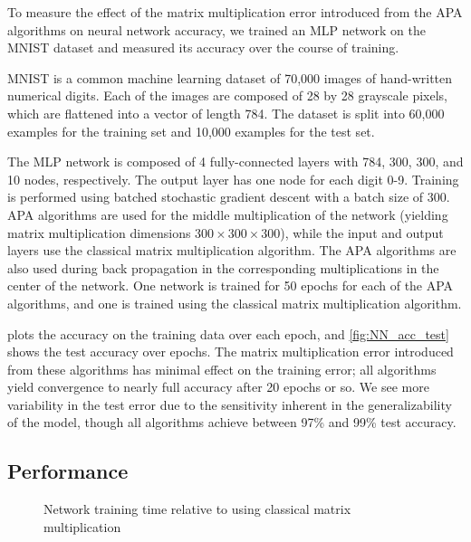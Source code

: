 \documentclass[sigconf,review,anonymous]{acmart}
\newcommand{\datafile}{}
\newcommand{\threads}{}
\begin{document}
To measure the effect of the matrix multiplication error introduced from the APA algorithms on neural network accuracy, we trained an MLP network on the MNIST dataset \cite{LBBH98} and measured its accuracy over the course of training. 

MNIST is a common machine learning dataset of 70,000 images of hand-written numerical digits. 
Each of the images are composed of 28 by 28 grayscale pixels, which are flattened into a vector of length 784.
The dataset is split into 60,000 examples for the training set and 10,000 examples for the test set. 

The MLP network is composed of 4 fully-connected layers with 784, 300, 300, and 10 nodes, respectively.  
The output layer has one node for each digit 0-9. 
Training is performed using batched stochastic gradient descent with a batch size of 300.
APA algorithms are used for the middle multiplication of the network (yielding matrix multiplication dimensions $300\times 300\times300$), while the input and output layers use the classical matrix multiplication algorithm. 
The APA algorithms are also used during back propagation in the corresponding multiplications in the center of the network.
One network is trained for 50 epochs for each of the APA algorithms, and one is trained using the classical matrix multiplication algorithm.

 plots the accuracy on the training data over each epoch, and \cref{fig:NN_acc_test} shows the test accuracy over epochs. 
The matrix multiplication error introduced from these algorithms has minimal effect on the training error; all algorithms yield convergence to nearly full accuracy after 20 epochs or so.
We see more variability in the test error due to the sensitivity inherent in the generalizability of the model, though all algorithms achieve between 97\% and 99\% test accuracy.

\subsection{Performance}
\label{sec:NNperf}

\begin{figure*}[t!]
%
\subfloat[One thread]{
\centering
\renewcommand{\datafile}{data/NN_seq.dat}
\renewcommand{\threads}{1}

\label{fig:NNreltime_seq}}
%
\hfill
\subfloat[Six threads]{
\centering
\renewcommand{\datafile}{data/NN_par_6.dat}
\renewcommand{\threads}{6}

\label{fig:NNreltime_par_6}}
%
\hfill
\subfloat[Twelve threads]{
\centering
\renewcommand{\datafile}{data/NN_par_12.dat}
\renewcommand{\threads}{12}

\label{fig:NNreltime_par_12}}
%
\caption{Network training time relative to using classical matrix multiplication}
\label{fig:NNreltime}
\end{figure*}
\end{document}
